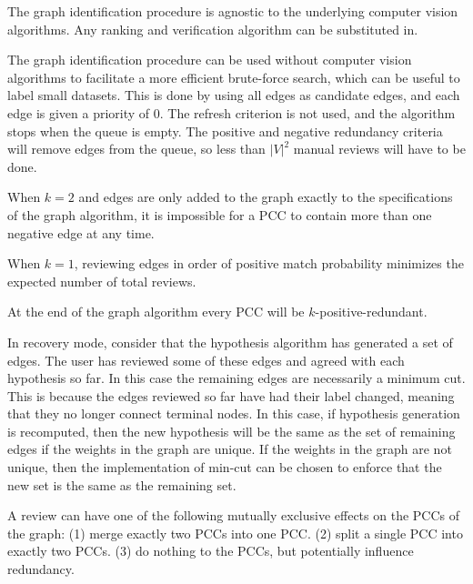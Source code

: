 \begin{appendices}
\begin{enumln}
\item The graph identification procedure is agnostic to the underlying computer vision algorithms.
    Any ranking and verification algorithm can be substituted in.

\item The graph identification procedure can be used without computer vision algorithms to facilitate a more
  efficient brute-force search, which can be useful to label small datasets.
This is done by using all edges as candidate edges, and each edge is given a priority of $0$.
The refresh criterion is not used, and the algorithm stops when the queue is empty.
The positive and negative redundancy criteria will remove edges from the queue, so less than $|V|^2$ manual
  reviews will have to be done.

\item When $k=2$ and edges are only added to the graph exactly to the specifications of the graph algorithm, it
  is impossible for a PCC to contain more than one negative edge at any time.

\item When $k=1$, reviewing edges in order of positive match probability minimizes the expected number of total
  reviews.

\item At the end of the graph algorithm every PCC will be $k$-positive-redundant.

\item In recovery mode, consider that the hypothesis algorithm has generated a set of edges.
The user has reviewed some of these edges and agreed with each hypothesis so far.
In this case the remaining edges are necessarily a minimum cut.
This is because the edges reviewed so far have had their label changed, meaning that they no longer connect
  terminal nodes.
In this case, if hypothesis generation is recomputed, then the new hypothesis will be the same as the set of
  remaining edges if the weights in the graph are unique.
If the weights in the graph are not unique, then the implementation of min-cut can be chosen to enforce that the
  new set is the same as the remaining set.

\item A review can have one of the following mutually exclusive effects on the PCCs of the graph:
    (1) merge exactly two PCCs into one PCC.
    (2) split a single PCC into exactly two PCCs.
    (3) do nothing to the PCCs, but potentially influence redundancy.
\end{enumln}
  

\end{appendices}
